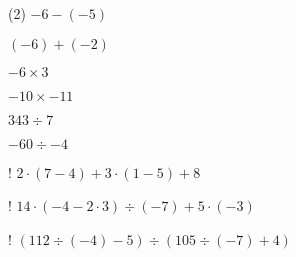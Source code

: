 \documentclass[]{srs}
\begin{document}
\begin{preguntas}(2)
\pregunta $-6-\left(-5\right)$
\begin{malla}[height=5cm]
\end{malla}
\pregunta $\left(-6\right)+\left(-2\right)$
\begin{malla}[height=5cm]
\end{malla}
\pregunta $-6\times 3$
\begin{malla}[height=5cm]
\end{malla}
\pregunta $-10\times -11$
\begin{malla}[height=5cm]
\end{malla}
\pregunta $343\div 7$
\begin{malla}[height=5cm]
\end{malla}
\pregunta $-60\div -4$
\begin{malla}[height=5cm]
\end{malla}
\pregunta! $2\cdot\left(7-4\right)+3\cdot\left(1-5\right)+8$
\begin{malla}[height=6cm]
\end{malla}
\pregunta! $14\cdot\left(-4-2\cdot 3\right)\div\left(-7\right) +5\cdot\left(-3\right)$
\begin{malla}[height=6cm]
\end{malla}
\pregunta! $\left(112\div\left(-4\right)-5\right)\div\left(105\div\left(-7\right)+4\right)$
\begin{malla}[height=6cm]
\end{malla}

\end{preguntas}
\end{document}

